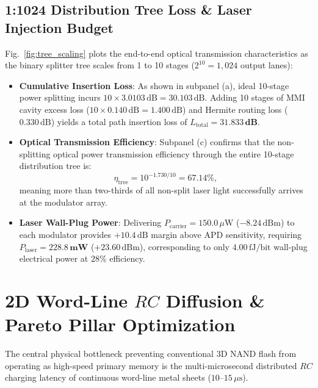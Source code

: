 \documentclass[journal]{IEEEtran}
\begin{document}
\subsection{1:1024 Distribution Tree Loss \& Laser Injection Budget}
Fig.~\ref{fig:tree_scaling} plots the end-to-end optical transmission characteristics as the binary splitter tree scales from 1 to 10 stages ($2^{10} = 1,024$ output lanes):
\begin{itemize}
    \item \textbf{Cumulative Insertion Loss}: As shown in subpanel (a), ideal 10-stage power splitting incurs $10 \times 3.0103\,\text{dB} = 30.103\,\text{dB}$. Adding 10 stages of MMI cavity excess loss ($10 \times 0.140\,\text{dB} = 1.400\,\text{dB}$) and Hermite routing loss ($0.330\,\text{dB}$) yields a total path insertion loss of $L_{\text{total}} = \mathbf{31.833\,\text{dB}}$.
    \item \textbf{Optical Transmission Efficiency}: Subpanel (c) confirms that the non-splitting optical power transmission efficiency through the entire 10-stage distribution tree is:
    \begin{equation}
        \eta_{\text{tree}} = 10^{-1.730/10} = \mathbf{67.14\%},
    \end{equation}
    meaning more than two-thirds of all non-split laser light successfully arrives at the modulator array.
    \item \textbf{Laser Wall-Plug Power}: Delivering $P_{\text{carrier}} = 150.0\,\mu\text{W}$ ($-8.24\,\text{dBm}$) to each modulator provides $+10.4\,\text{dB}$ margin above APD sensitivity, requiring $P_{\text{laser}} = \mathbf{228.8\,\text{mW}}$ ($+23.60\,\text{dBm}$), corresponding to only $4.00\,\text{fJ/bit}$ wall-plug electrical power at $28\%$ efficiency.
\end{itemize}

\section{2D Word-Line $RC$ Diffusion \& Pareto Pillar Optimization}
\label{sec:rc_diffusion}

The central physical bottleneck preventing conventional 3D NAND flash from operating as high-speed primary memory is the multi-microsecond distributed $RC$ charging latency of continuous word-line metal sheets ($10$--$15\,\mu\text{s}$).
\end{document}
